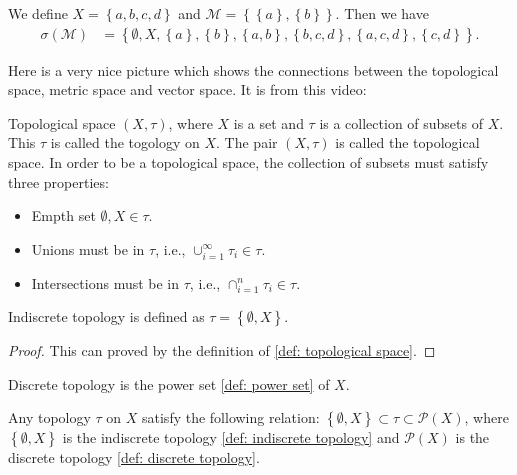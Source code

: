 \documentclass[../../note.tex]{subfiles}
\begin{document}
\begin{example}
    We define $X = \left\{a,b,c,d\right\}$ and $\mathcal{M}=\left\{\left\{a\right\}, \left\{b\right\}\right\}$. Then we have 
    \begin{align}
        \sigma(\mathcal{M})
        &= \left\{\emptyset, X, \left\{a\right\}, \left\{b\right\},\left\{a,b\right\}, \left\{b,c,d\right\},\left\{a,c,d\right\}, \left\{c,d\right\}\right\}.
    \end{align}
\end{example}

Here is a very nice picture which shows the connections between the topological space, metric space and vector space. It is from this video: 

\begin{definition}
    \label{def: topological space}
    Topological space $(X, \tau)$, where $X$ is a set and $\tau$ is a collection of subsets of $X$. This $\tau$ is called the togology on $X$. The pair $(X, \tau)$ is called the topological space. In order to be a topological space, the collection of subsets must satisfy three properties:
    \begin{itemize}
        \item Empth set $\emptyset, X \in \tau$.
        \item Unions must be in $\tau$, i.e., $\cup_{i=1}^{\infty} \tau_i \in \tau$.
        \item Intersections must be in $\tau$, i.e., $\cap_{i=1}^{n} \tau_i \in \tau$.
    \end{itemize}
\end{definition}

\begin{definition}
    \label{def: indiscrete topology}
    Indiscrete topology is defined as $\tau = \left\{\emptyset, X \right\}$.
\end{definition}
\begin{proof}
    This can proved by the definition of \ref{def: topological space}.
\end{proof}

\begin{definition}
    \label{def: discrete topology}
    Discrete topology is the power set \ref{def: power set} of $X$.
\end{definition}

\begin{proposition}
    Any topology $\tau$ on $X$ satisfy the following relation: $\left\{\emptyset, X\right\} \subset \tau \subset \mathcal{P}(X)$, where $\left\{\emptyset, X\right\}$ is the indiscrete topology \ref{def: indiscrete topology} and $ \mathcal{P}(X)$ is the discrete topology \ref{def: discrete topology}.
\end{proposition}
\end{document}

